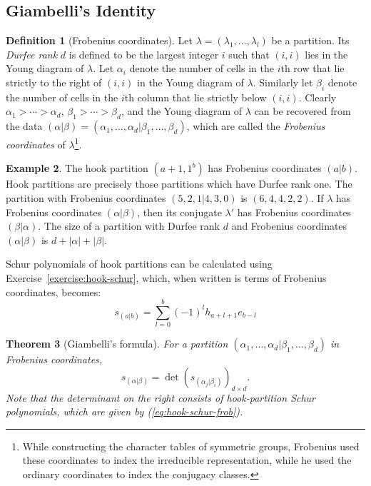\documentclass[11pt]{amsproc}
\newtheorem{theorem}{Theorem}[subsection]
\theoremstyle{definition}
\newtheorem{definition}[theorem]{Definition}
\theoremstyle{example}
\newtheorem{example}[theorem]{Example}
\begin{document}
\subsection{Giambelli's Identity}
\label{sec:giambelli}
\begin{definition}
  [Frobenius coordinates]
  Let $\lambda=(\lambda_1,\dotsc,\lambda_l)$ be a partition.
  Its \emph{Durfee rank} $d$ is defined to be the largest integer $i$ such that $(i,i)$ lies in the Young diagram of $\lambda$.
  Let $\alpha_i$ denote the number of cells in the $i$th row that lie strictly to the right of $(i,i)$ in the Young diagram of $\lambda$.
  Similarly let $\beta_i$ denote the number of cells in the $i$th column that lie strictly below $(i,i)$.
  Clearly $\alpha_1>\dotsb>\alpha_d$, $\beta_1>\dotsb>\beta_d$, and the Young diagram of $\lambda$ can be recovered from the data $(\alpha|\beta)=(\alpha_1,\dotsc,\alpha_d|\beta_1,\dotsc,\beta_d)$, which are called the \emph{Frobenius coordinates} of $\lambda$\footnote{While constructing the character tables of symmetric groups, Frobenius used these coordinates to index the irreducible representation, while he used the ordinary coordinates to index the conjugacy classes.}.
\end{definition}
\begin{example}
  The hook partition $(a+1,1^b)$ has Frobenius coordinates $(a|b)$.
  Hook partitions are precisely those partitions which have Durfee rank one.
  The partition with Frobenius coordinates $(5,2,1|4,3,0)$ is $(6,4,4,2,2)$.
  If $\lambda$ has Frobenius coordinates $(\alpha|\beta)$, then its conjugate $\lambda'$ has Frobenius coordinates $(\beta|\alpha)$.
  The size of a partition with Durfee rank $d$ and Frobenius coordinates $(\alpha|\beta)$ is $d+|\alpha|+|\beta|$. 
\end{example}
Schur polynomials of hook partitions can be calculated using Exercise~\ref{exercise:hook-schur}, which, when written is terms of Frobenius coordinates, becomes:
\begin{equation}
  \label{eq:hook-schur-frob}
  s_{(a|b)} = \sum_{l=0}^b (-1)^l h_{a+l+1}e_{b-l}
\end{equation}
\begin{theorem}
  [Giambelli's formula]
  For a partition $(\alpha_1,\dotsc,\alpha_d|\beta_1,\dotsc,\beta_d)$  in Frobenius coordinates,
  \begin{equation}
    \label{eq:giambelli}
    s_{(\alpha|\beta)} = \det(s_{(\alpha_j|\beta_i)})_{d\times d}.
  \end{equation}
  Note that the determinant on the right consists of hook-partition Schur polynomials, which are given by \textup{(\ref{eq:hook-schur-frob})}.
\end{theorem}
\end{document}
